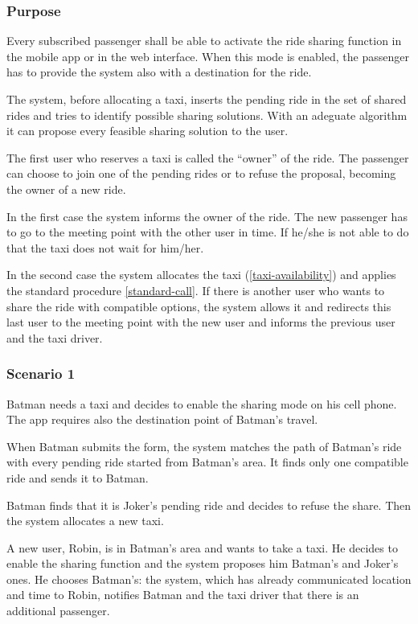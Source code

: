\label{ride-sharing}
\subsubsection{Purpose}

Every subscribed passenger shall be able to activate the ride sharing function in the mobile app or in the web interface. When this mode is enabled, the passenger has to provide the system also with a destination for the ride.

The system, before allocating a taxi, inserts the pending ride in the set of shared rides and tries to identify possible sharing solutions.
With an adeguate algorithm it can propose every feasible sharing solution to the user.

The first user who reserves a taxi is called the ``owner'' of the ride.
The passenger can choose to join one of the pending rides or to refuse the proposal, becoming the owner of a new ride.

In the first case the system informs the owner of the ride. The new passenger has to go to the meeting point with the other user in time. If he/she is not able to do that the taxi does not wait for him/her.

In the second case the system allocates the taxi (\ref{taxi-availability}) and applies the standard procedure \ref{standard-call}. If there is another user who wants to share the ride with compatible options, the system allows it and redirects this last user to the meeting point with the new user and informs the previous user and the taxi driver.

\subsubsection{Scenario 1}
Batman needs a taxi and decides to enable the sharing mode on his cell phone. The app requires also the destination point of Batman's travel.
 
When Batman submits the form, the system matches the path of Batman's ride with every pending ride started from Batman's area. It finds only one compatible ride and sends it to Batman.
 
Batman finds that it is Joker's pending ride and decides to refuse the share. Then the system allocates a new taxi.

A new user, Robin, is in Batman's area and wants to take a taxi. He decides to enable the sharing function and the system proposes him Batman's and Joker's ones. He chooses Batman's: the system, which has already communicated location and time to Robin, notifies Batman and the taxi driver that there is an additional passenger.

